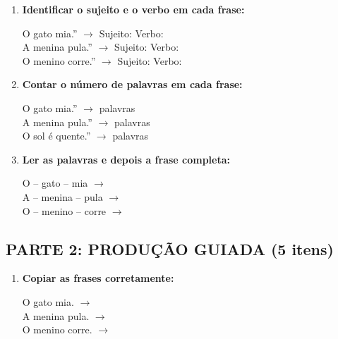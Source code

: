 \begin{exercicio}
\begin{enumerate}
  \item \textbf{Identificar o sujeito e o verbo em cada frase:}
  \begin{center}
  O gato mia.'' $\rightarrow$ Sujeito: \underline{\hspace{3cm}} Verbo: \underline{\hspace{3cm}} \\
  A menina pula.'' $\rightarrow$ Sujeito: \underline{\hspace{3cm}} Verbo: \underline{\hspace{3cm}} \\
  O menino corre.'' $\rightarrow$ Sujeito: \underline{\hspace{3cm}} Verbo: \underline{\hspace{3cm}}
  \end{center}

  \item \textbf{Contar o número de palavras em cada frase:}
  \begin{center}
  O gato mia.'' $\rightarrow$ \underline{\hspace{1cm}} palavras \\
  A menina pula.'' $\rightarrow$ \underline{\hspace{1cm}} palavras \\
  O sol é quente.'' $\rightarrow$ \underline{\hspace{1cm}} palavras
  \end{center}

  \item \textbf{Ler as palavras e depois a frase completa:}
  \begin{center}
  O -- gato -- mia $\rightarrow$ \underline{\hspace{4cm}} \\
  A -- menina -- pula $\rightarrow$ \underline{\hspace{4cm}} \\
  O -- menino -- corre $\rightarrow$ \underline{\hspace{4cm}}
  \end{center}
\end{enumerate}

\subsection*{PARTE 2: PRODUÇÃO GUIADA (5 itens)}

\begin{enumerate}[resume]
  \item \textbf{Copiar as frases corretamente:}
  \begin{center}
  O gato mia. $\rightarrow$ \underline{\hspace{6cm}} \\
  A menina pula. $\rightarrow$ \underline{\hspace{6cm}} \\
  O menino corre. $\rightarrow$ \underline{\hspace{6cm}}
  \end{center}


\end{enumerate}
\end{exercicio}
